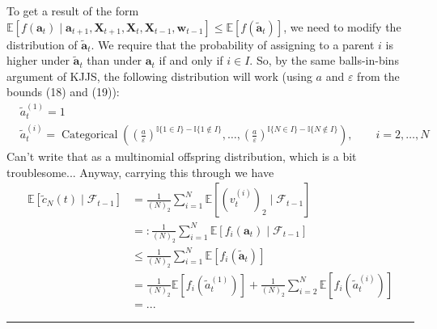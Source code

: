 \documentclass{article}
\newcommand{\E}{\mathbb{E}}
\newcommand{\vt}[2][t]{v_{#1}^{(#2)}}
\begin{document}
To get a result of the form $\E[f(\mathbf{a}_t)\mid \mathbf{a}_{t+1}, \mathbf{X}_{t+1}, \mathbf{X}_{t}, \mathbf{X}_{t-1}, \mathbf{w}_{t-1}] \leq \E[f(\tilde{\mathbf{a}}_t)]$, we need to modify the distribution of $\tilde{\mathbf{a}}_t$. We require that the probability of assigning to a parent $i$ is higher under $\tilde{\mathbf{a}}_t$ than under $\mathbf{a}_t$ if and only if $i \in I$. So, by the same balls-in-bins argument of KJJS, the following distribution will work (using $a$ and $\varepsilon$ from the bounds (18) and (19)):
\begin{align*}
& \tilde{a}_t^{(1)} = 1\\
& \tilde{a}_t^{(i)} = \operatorname{Categorical}\left( \left(\frac{a}{\varepsilon}\right)^{\mathbb{I}\{1\in I\} - \mathbb{I}\{1\notin I\}}, \dots, \left(\frac{a}{\varepsilon}\right)^{\mathbb{I}\{N\in I\} - \mathbb{I}\{N\notin I\}} \right), \qquad i=2,\dots,N
\end{align*}
Can't write that as a multinomial offspring distribution, which is a bit troublesome...
Anyway, carrying this through we have
\begin{align*}
\E[\tilde{c}_N(t)\mid \mathcal{F}_{t-1}] &= \frac{1}{(N)_2} \sum_{i=1}^N \E[(\vt{i})_2\mid \mathcal{F}_{t-1}] \\
&=: \frac{1}{(N)_2} \sum_{i=1}^N \E[f_i(\mathbf{a}_t) \mid \mathcal{F}_{t-1}]\\
&\leq \frac{1}{(N)_2} \sum_{i=1}^N \E[f_i(\tilde{\mathbf{a}}_t)] \\
&= \frac{1}{(N)_2} \E[f_i(\tilde{a}_t^{(1)})] + \frac{1}{(N)_2} \sum_{i=2}^N \E[f_i(\tilde{a}_t^{(i)})] \\
&= ...
\end{align*}

\rule{\textwidth}{1pt}
\end{document}
